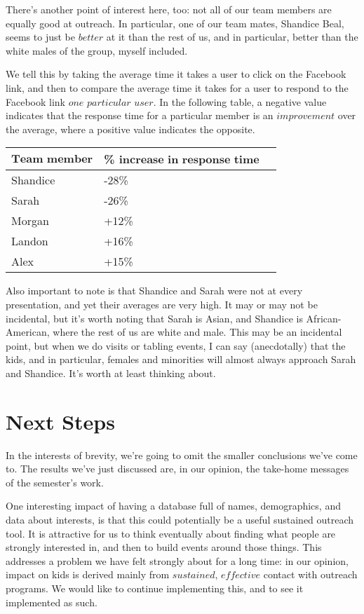 \documentclass[11pt,a4paper]{article}
\begin{document}
There's another point of interest here, too: not all of our team members are equally good at outreach. In particular, one of our team mates, Shandice Beal, seems to just be $\textit{better}$ at it than the rest of us, and in particular, better than the white males of the group, myself included.

We tell this by taking the average time it takes a user to click on the Facebook link, and then to compare the average time it takes for a user to respond to the Facebook link $\textit{one particular user}$. In the following table, a negative value indicates that the response time for a particular member is an $\textit{improvement}$ over the average, where a positive value indicates the opposite.

\begin{center}
\begin{tabular}{l | l c }
   $\textbf{Team member}$ & \% $\textbf{increase in response time}$ \\
   \hline
   Shandice & -28\% \\
   Sarah & -26\% \\
   Morgan & +12\% \\
   Landon & +16\% \\
   Alex & +15\% \\
\end{tabular}
\end{center}

Also important to note is that Shandice and Sarah were not at every presentation, and yet their averages are very high. It may or may not be incidental, but it's worth noting that Sarah is Asian, and Shandice is African-American, where the rest of us are white and male. This may be an incidental point, but when we do visits or tabling events, I can say (anecdotally) that the kids, and in particular, females and minorities will almost always approach Sarah and Shandice. It's worth at least thinking about.

\section{Next Steps}

In the interests of brevity, we're going to omit the smaller conclusions we've come to. The results we've just discussed are, in our opinion, the take-home messages of the semester's work.

One interesting impact of having a database full of names, demographics, and data about interests, is that this could potentially be a useful sustained outreach tool. It is attractive for us to think eventually about finding what people are strongly interested in, and then to build events around those things. This addresses a problem we have felt strongly about for a long time: in our opinion, impact on kids is derived mainly from $\textit{sustained, effective}$ contact with outreach programs. We would like to continue implementing this, and to see it implemented as such.
\end{document}
